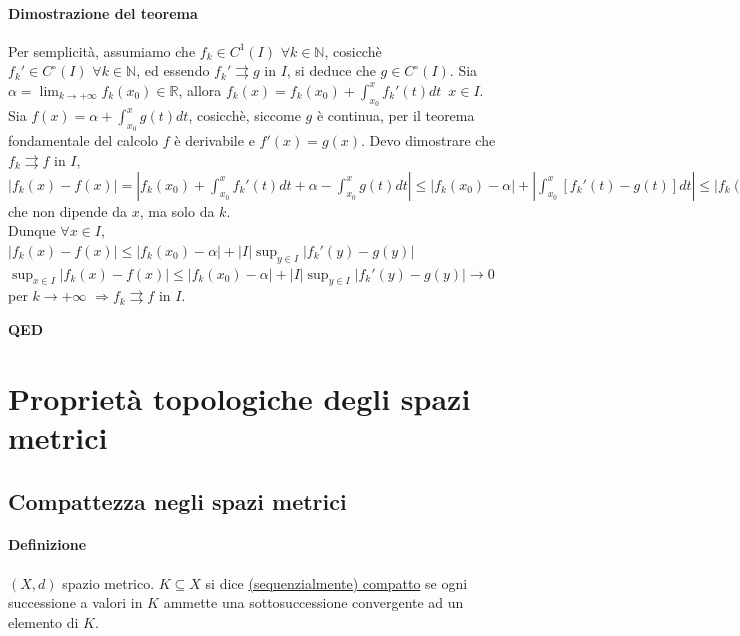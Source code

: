 \documentclass{article}
\newcommand{\R}{\mathbb{R}}
\newcommand{\N}{\mathbb{N}}
\begin{document}
\paragraph{{Dimostrazione del teorema}}
Per semplicità, assumiamo che $f_k\in C^1(I)\,\, \forall k \in \N$, cosicchè $f_k' \in C^\circ(I) \,\, \forall k \in \N$, ed essendo $f_k' \rightrightarrows g$ in $I$, si deduce che $g \in C^\circ (I)$. Sia $\alpha = \lim_{k \rightarrow +\infty}f_k(x_0) \in \R$, allora $f_k(x) = f_k(x_0)+\int_{x_0}^{x}f_k' (t)dt\,\,\, x \in I $.\\
Sia $f(x) = \alpha + \int_{x_0}^{x}g(t) dt$, cosicchè, siccome $g$ è continua, per il teorema fondamentale del calcolo $f$ è derivabile e $f'(x) =g(x)$. Devo dimostrare che $f_k \rightrightarrows f$ in $I$, \\
$|f_k(x)-f(x)|= |f_k(x_0)+ \int_{x_0}^{x}f_k' (t) dt+\alpha - \int_{x_0}^{x}g(t) dt|\leq |f_k(x_0)-\alpha|+|\int_{x_0}^{x}[f_k'(t)-g(t)] dt|\leq |f_k(x_0)-\alpha| + |\int_{x_0}^{x}|f_k'(t)-g(t)|dt|\leq |f_k(x_0)-\alpha| + |\int_{x_0}^{x}\sup_{y \in I}|f_k'(y)-g(y)|dt|=|f_k(x_0)-\alpha|+ |x-x_0|\sup_{y \in I}|f_k'(y)-g(y)|\leq |f_k(x_0)-\alpha|+|I|\sup_{y\in I}|f_k'(y)-g(y)|$ che non dipende da $x$, ma solo da $k$.\\
Dunque $\forall x \in I$, $|f_k(x)-f(x)| \leq |f_k(x_0)-\alpha|+|I|\sup_{y\in I}|f_k'(y)-g(y)| $\\
$\sup_{x\in I}|f_k(x)-f(x)|\leq |f_k(x_0)-\alpha|+|I|\sup_{y \in I}|f_k'(y)-g(y)|\rightarrow0$ per $k \rightarrow +\infty$ $\Rightarrow f_k \rightrightarrows f$ in $I$.
\begin{flushright}
\textbf{QED}
\end{flushright}

\section{\Large\textbf{Proprietà topologiche degli spazi metrici}}
\subsection{{Compattezza negli spazi metrici}}
\paragraph{{Definizione}}
$(X,d)$ spazio metrico. $K \subseteq X$ si dice \underline{(sequenzialmente) compatto} se ogni successione a valori in $K$ ammette una sottosuccessione convergente ad un elemento di $K$.
\end{document}
